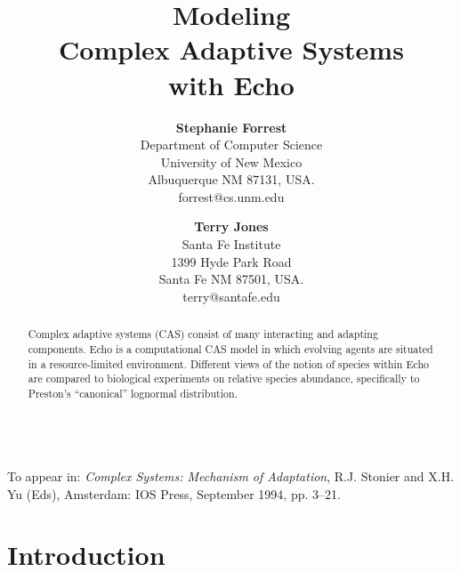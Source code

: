 

\title{\bf Modeling \\ Complex Adaptive Systems \\
       with Echo \\ }

\author
{
{\bf Stephanie Forrest} \\
Department of Computer Science \\
University of New Mexico \\
Albuquerque NM 87131, USA. \\
forrest@cs.unm.edu \\
\and
{\bf Terry Jones} \\
Santa Fe Institute \\
1399 Hyde Park Road \\
Santa Fe NM 87501, USA. \\
terry@santafe.edu \\
}

\maketitle

\begin{abstract}

Complex adaptive systems (CAS) consist of many interacting and
adapting components.  Echo is a computational CAS model in which
evolving agents are situated in a resource-limited environment.
Different views of the notion of species within Echo are compared to
biological experiments on relative species abundance, specifically to
Preston's ``canonical'' lognormal distribution.

\end{abstract}

\noindent
\hspace*{1.5in} \hrulefill \hspace*{1.5in} \\
\noindent
To appear in: {\em Complex Systems: Mechanism of Adaptation},
R.J. Stonier and X.H. Yu (Eds), Amsterdam: IOS Press, September 1994,
pp. 3--21. \\
\hspace*{1.5in} \hrulefill \hspace*{1.5in}

\section{Introduction}

